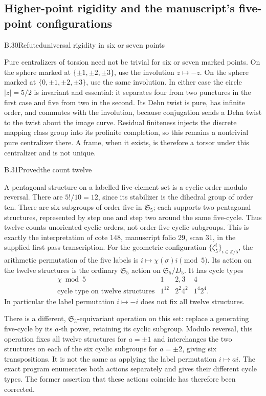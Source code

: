 \subsection{Higher-point rigidity and the manuscript's five-point configurations}


\begin{statement}{B.30}{Refuted}{universal rigidity in six or seven points}
\end{statement}
Pure centralizers of torsion need not be trivial for six or seven marked
points. On the sphere marked at $\{\pm1,\pm2,\pm3\}$, use the involution
$z\mapsto-z$. On the sphere marked at
$\{0,\pm1,\pm2,\pm3\}$, use the same involution. In either case the
circle $|z|=5/2$ is invariant and essential: it separates four from two
punctures in the first case and five from two in the second.
Its Dehn twist is pure, has infinite order, and commutes with the
involution, because conjugation sends a Dehn twist to the twist about the
image curve. Residual finiteness injects the discrete mapping class group
into its profinite completion, so this remains a nontrivial pure
centralizer there. A frame, when it exists, is therefore a torsor under
this centralizer and is not unique.

\begin{statement}{B.31}{Proved}{the count twelve}
\end{statement}
A pentagonal structure on a labelled five-element set is a cyclic order
modulo reversal. There are $5!/10=12$, since its stabilizer is the dihedral
group of order ten. There are six subgroups of order five in
$\mathfrak S_5$; each supports two pentagonal structures, represented by
step one and step two around the same five-cycle. Thus twelve counts
unoriented cyclic orders, not order-five cyclic subgroups. This is exactly
the interpretation of cote 148, manuscript folio 29, scan 31, in the
supplied first-pass transcription.
For the geometric configuration $\{\zeta_5^i\}_{i\in\mathbb Z/5}$,
the arithmetic permutation of the five labels is
$i\mapsto\chi(\sigma)i\pmod5$. Its action on the twelve structures
is the ordinary $\mathfrak S_5$ action on
$\mathfrak S_5/D_5$. It has cycle types
\[
 \begin{array}{c|ccc}
 \chi\bmod5&1&2,3&4\\\hline
 \text{cycle type on twelve structures}&1^{12}&2^2 4^2&1^4 2^4.
 \end{array}
\]
In particular the label permutation $i\mapsto-i$ does not fix all
twelve structures.

There is a different, $\mathfrak S_5$-equivariant operation on this
set: replace a generating five-cycle by its $a$-th power, retaining
its cyclic subgroup. Modulo reversal, this operation fixes all twelve
structures for $a=\pm1$ and interchanges the two structures on each
of the six cyclic subgroups for $a=\pm2$, giving six transpositions.
It is not the same as applying the label permutation $i\mapsto ai$.
The exact program enumerates both actions separately and gives their
different cycle types. The former assertion that these actions coincide
has therefore been corrected.

